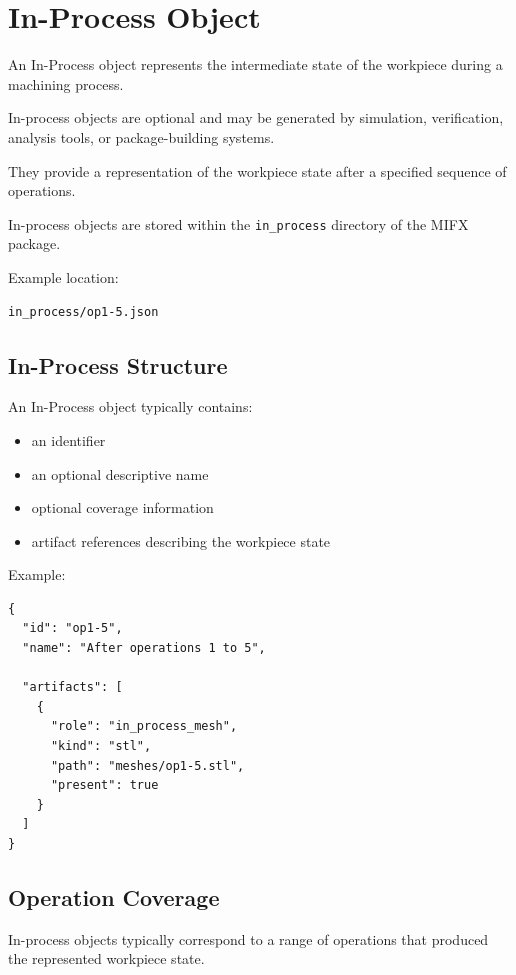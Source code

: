 \section{In-Process Object}

An In-Process object represents the intermediate state of the workpiece during a machining process.

In-process objects are optional and may be generated by simulation, verification, analysis tools, or package-building systems.

They provide a representation of the workpiece state after a specified sequence of operations.

In-process objects are stored within the \texttt{in\_process} directory of the MIFX package.

Example location:

\begin{verbatim}
in_process/op1-5.json
\end{verbatim}

\subsection{In-Process Structure}

An In-Process object typically contains:

\begin{itemize}
\item an identifier
\item an optional descriptive name
\item optional coverage information
\item artifact references describing the workpiece state
\end{itemize}

Example:

\begin{verbatim}
{
  "id": "op1-5",
  "name": "After operations 1 to 5",

  "artifacts": [
    {
      "role": "in_process_mesh",
      "kind": "stl",
      "path": "meshes/op1-5.stl",
      "present": true
    }
  ]
}
\end{verbatim}

\subsection{Operation Coverage}

In-process objects typically correspond to a range of operations that produced the represented workpiece state.

